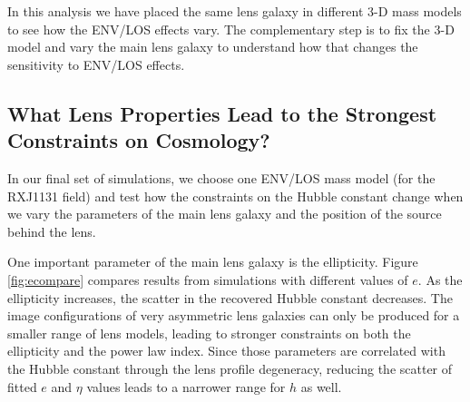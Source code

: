\documentclass{emulateapj}
\begin{document}
In this analysis we have placed the same lens galaxy in different 3-D mass models to see how the ENV/LOS effects vary.  The complementary step is to fix the 3-D model and vary the main lens galaxy to understand how that changes the sensitivity to ENV/LOS effects.

\subsection{What Lens Properties Lead to the Strongest Constraints on Cosmology?}
\label{sec:ImageConfigs}

In our final set of simulations, we choose one ENV/LOS mass model (for the RXJ1131 field) and test how the constraints on the Hubble constant change when we vary the parameters of the main lens galaxy and the position of the source behind the lens.

One important parameter of the main lens galaxy is the ellipticity. Figure \ref{fig:ecompare} compares results from simulations with different values of $e$.  As the ellipticity increases, the scatter in the recovered Hubble constant decreases.
The image configurations of very asymmetric lens galaxies can only be produced for a smaller range of lens models, leading to stronger constraints on both the ellipticity and the power law index.  Since those parameters are correlated with the Hubble constant through the lens profile degeneracy, reducing the scatter of fitted $e$ and $\eta$ values leads to a narrower range for $h$ as well.
\end{document}
